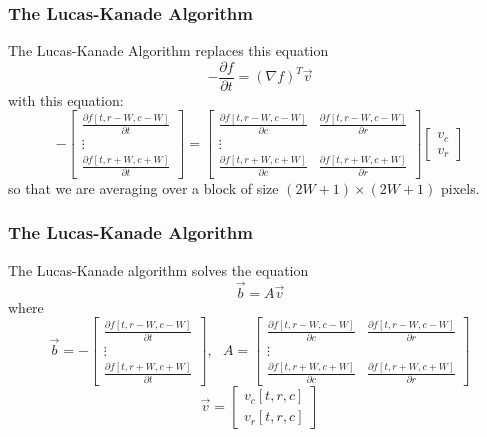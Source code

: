 \documentclass{beamer}
\begin{document}
\begin{frame}
  \frametitle{The Lucas-Kanade Algorithm}

  The Lucas-Kanade Algorithm replaces this equation
  \[
  -\frac{\partial f}{\partial t} =(\nabla f)^T\vec{v}
  \]
  with this equation:
  \[
  -\left[\begin{array}{c}
      \frac{\partial f[t,r-W,c-W]}{\partial t}\\
      \vdots\\
      \frac{\partial f[t,r+W,c+W]}{\partial t}
    \end{array}\right]
  =
  \left[\begin{array}{cc}
      \frac{\partial f[t,r-W,c-W]}{\partial c}&\frac{\partial f[t,r-W,c-W]}{\partial r}\\
      \vdots\\
      \frac{\partial f[t,r+W,c+W]}{\partial c}&\frac{\partial f[t,r+W,c+W]}{\partial r}
    \end{array}\right]
  \left[\begin{array}{c}v_c\\ v_r\end{array}\right]
  \]
  so that we are averaging over a block of size $(2W+1)\times(2W+1)$ pixels.
\end{frame}

\begin{frame}
  \frametitle{The Lucas-Kanade Algorithm}

  The Lucas-Kanade algorithm solves the equation
  \[\vec{b}=A\vec{v} \]
  where
  \[
  \vec{b} = -\left[\begin{array}{c}
      \frac{\partial f[t,r-W,c-W]}{\partial t}\\
      \vdots\\
      \frac{\partial f[t,r+W,c+W]}{\partial t}
    \end{array}\right],~~~
  A=\left[\begin{array}{cc}
      \frac{\partial f[t,r-W,c-W]}{\partial c}&\frac{\partial f[t,r-W,c-W]}{\partial r}\\
      \vdots\\
      \frac{\partial f[t,r+W,c+W]}{\partial c}&\frac{\partial f[t,r+W,c+W]}{\partial r}
    \end{array}\right]
  \]
  \[
  \vec{v}=\left[\begin{array}{c}v_c[t,r,c]\\ v_r[t,r,c]\end{array}\right]
  \]
\end{frame}
\end{document}
